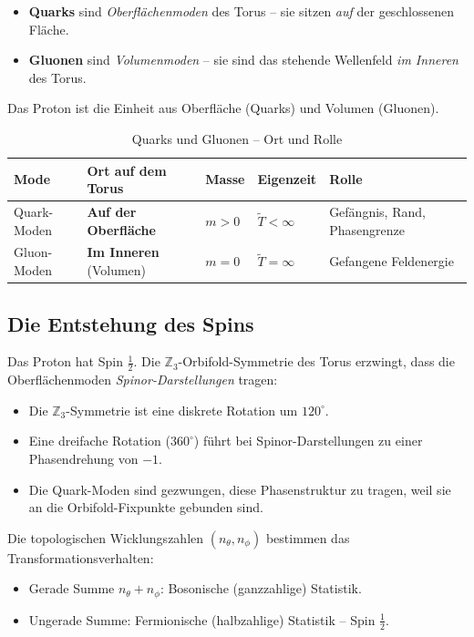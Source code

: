 \documentclass[11pt,a4paper]{article}
\begin{document}
	\begin{itemize}
		\item \textbf{Quarks} sind \emph{Oberflächenmoden} des Torus -- sie sitzen \emph{auf} der geschlossenen Fläche.
		\item \textbf{Gluonen} sind \emph{Volumenmoden} -- sie sind das stehende Wellenfeld \emph{im Inneren} des Torus.
	\end{itemize}
	
	Das Proton ist die Einheit aus Oberfläche (Quarks) und Volumen (Gluonen).
	
	\begin{table}[ht]
		\centering
		\caption{Quarks und Gluonen -- Ort und Rolle}
		\label{tab:orten}
		\begin{tabular}{lllll}
			\toprule
			Mode & Ort auf dem Torus & Masse & Eigenzeit & Rolle \\
			\midrule
			Quark-Moden & \textbf{Auf der Oberfläche} & \(m > 0\) & \(\tilde{T}<\infty\) & Gefängnis, Rand, Phasengrenze \\
			Gluon-Moden & \textbf{Im Inneren} (Volumen) & \(m = 0\) & \(\tilde{T}=\infty\) & Gefangene Feldenergie \\
			\bottomrule
		\end{tabular}
	\end{table}
	
	\subsection{Die Entstehung des Spins}
	
	Das Proton hat Spin \(\frac{1}{2}\). Die \(\mathbb{Z}_3\)-Orbifold-Symmetrie des Torus erzwingt, dass die Oberflächenmoden \emph{Spinor-Darstellungen} tragen:
	\begin{itemize}
		\item Die \(\mathbb{Z}_3\)-Symmetrie ist eine diskrete Rotation um \(120^\circ\).
		\item Eine dreifache Rotation (\(360^\circ\)) führt bei Spinor-Darstellungen zu einer Phasendrehung von \(-1\).
		\item Die Quark-Moden sind gezwungen, diese Phasenstruktur zu tragen, weil sie an die Orbifold-Fixpunkte gebunden sind.
	\end{itemize}
	
	Die topologischen Wicklungszahlen \((n_\theta, n_\phi)\) bestimmen das Transformationsverhalten:
	\begin{itemize}
		\item Gerade Summe \(n_\theta + n_\phi\): Bosonische (ganzzahlige) Statistik.
		\item Ungerade Summe: Fermionische (halbzahlige) Statistik -- Spin \(\frac{1}{2}\).
	\end{itemize}
	
\end{document}
